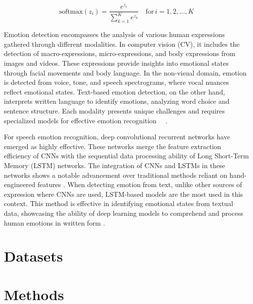 \documentclass[runningheads]{llncs}
\begin{document}
\begin{equation}
\text{softmax}(z_i) = \frac{e^{z_i}}{\sum_{k=1}^{K} e^{z_k}} \quad \text{for} \, i = 1, 2, ..., K
\label{eq:sofmax}
\end{equation}

Emotion detection encompasses the analysis of various human expressions gathered through different modalities. In computer vision (CV), it includes the detection of macro-expressions, micro-expressions, and body expressions from images and videos. These expressions provide insights into emotional states through facial movements and body language. In the non-visual domain, emotion is detected from voice, tone, and speech spectrograms, where vocal nuances reflect emotional states. Text-based emotion detection, on the other hand, interprets written language to identify emotions, analyzing word choice and sentence structure. Each modality presents unique challenges and requires specialized models for effective emotion recognition \cite{Chul2018}~\cite{Trigeorgis2016}~\cite{Karna2020}.

For speech emotion recognition, deep convolutional recurrent networks have emerged as highly effective. These networks merge the feature extraction efficiency of CNNs with the sequential data processing ability of Long Short-Term Memory (LSTM) networks. The integration of CNNs and LSTMs in these networks shows a notable advancement over traditional methods reliant on hand-engineered features \cite{Trigeorgis2016}. When detecting emotion from text, unlike other sources of expression where CNNs are used, LSTM-based models are the most used in this context. This method is effective in identifying emotional states from textual data, showcasing the ability of deep learning models to comprehend and process human emotions in written form \cite{Karna2020}.


\section{Datasets}
\label{sec:datasets}


\section{Methods}
\label{sec:methods}

\end{document}

